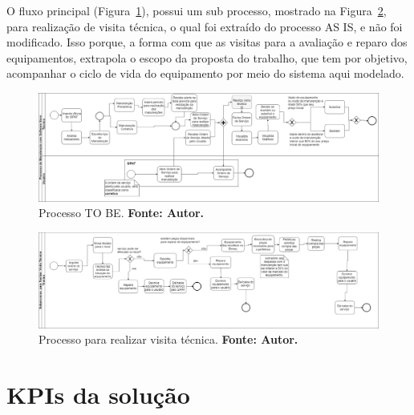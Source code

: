 O fluxo principal (Figura~\ref{processo-to-be}), possui um sub processo, mostrado na Figura~\ref{subprocesso-to-be}, para realização de visita técnica, o qual foi extraído do processo AS IS, e não foi modificado. Isso porque, a forma com que as visitas para a avaliação e reparo dos equipamentos, extrapola o escopo da proposta do trabalho, que tem por objetivo, acompanhar o ciclo de vida do equipamento por meio do sistema aqui modelado. 


\begin{landscape}
\graphicspath{{figuras/}}
\begin{figure}[H]
\centering
\includegraphics[width=1.5\textwidth]{processo_to_be}
\caption{Processo TO BE. \textbf{Fonte: Autor.}}
\label{processo-to-be}
\end{figure}
\end{landscape} 


\begin{landscape}
\graphicspath{{figuras/}}
\begin{figure}[H]
\centering
\includegraphics[width=1.5\textwidth]{subprocesso_to_be}
\caption{Processo para realizar visita técnica. \textbf{Fonte: Autor.}}
\label{subprocesso-to-be}
\end{figure}
\end{landscape}


\section{KPIs da solução}
\label{indicadores da solucao}

